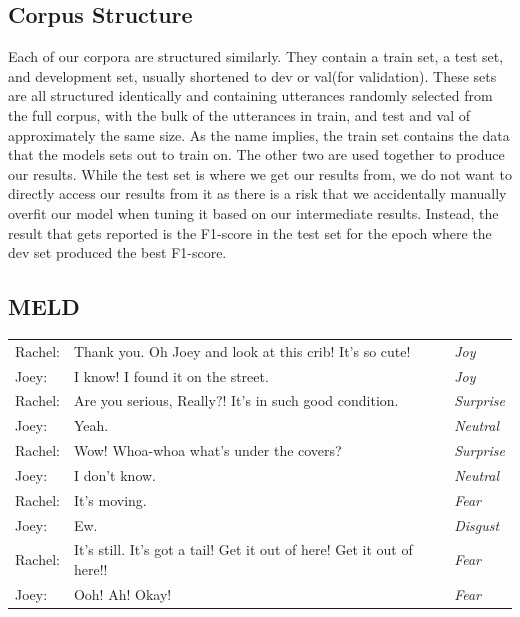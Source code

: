 \documentclass[nofilelist]{cslthse-msc}
\begin{document}
\subsection{Corpus Structure}
Each of our corpora are structured similarly. They contain a train set, a test set, and development set, usually shortened to dev or val(for validation). These sets are all structured identically and containing utterances randomly selected from the full corpus, with the bulk of the utterances in train, and test and val of approximately the same size. As the name implies, the train set contains the data that the models sets out to train on. The other two are used together to produce our results. While the test set is where we get our results from, we do not want to directly access our results from it as there is a risk that we accidentally manually overfit our model when tuning it based on our intermediate results. Instead, the result that gets reported is the F1-score in the test set for the epoch where the dev set produced the best F1-score. 


\subsection{MELD}

\newenvironment{pag}{\selectfont}{\par}


\begin{table}[!ht]
    \begin{pag}

    \centering
    \begin{tabular}{lll}
Rachel: & Thank you. Oh Joey and look at this crib! It's so cute! & \textit{Joy} \\
Joey: & I know! I found it on the street. & \textit{Joy} \\
Rachel: & Are you serious, Really?! It's in such good condition. & \textit{Surprise} \\
Joey: & Yeah. & \textit{Neutral} \\
Rachel: & Wow! Whoa-whoa what's under the covers? & \textit{Surprise} \\
Joey: & I don't know. & \textit{Neutral} \\
Rachel: & It's moving. & \textit{Fear} \\
Joey: & Ew. & \textit{Disgust} \\
Rachel: & It's still. It's got a tail! Get it out of here! Get it out of here!! & \textit{Fear} \\
Joey: & Ooh! Ah! Okay! & \textit{Fear} \\
    \end{tabular}
    \label{tab:dialogue_meld}
\end{pag}
\end{table}
\end{document}
